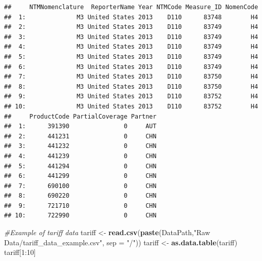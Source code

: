 \documentclass[10pt,]{article}
\newenvironment{Shaded}{\begin{snugshade}}{\end{snugshade}}
\newcommand{\KeywordTok}[1]{\textcolor[rgb]{0.13,0.29,0.53}{\textbf{{#1}}}}
\newcommand{\DataTypeTok}[1]{\textcolor[rgb]{0.13,0.29,0.53}{{#1}}}
\newcommand{\DecValTok}[1]{\textcolor[rgb]{0.00,0.00,0.81}{{#1}}}
\newcommand{\StringTok}[1]{\textcolor[rgb]{0.31,0.60,0.02}{{#1}}}
\newcommand{\CommentTok}[1]{\textcolor[rgb]{0.56,0.35,0.01}{\textit{{#1}}}}
\newcommand{\NormalTok}[1]{{#1}}
\begin{document}
\begin{verbatim}
##     NTMNomenclature  ReporterName Year NTMCode Measure_ID NomenCode
##  1:              M3 United States 2013    D110      83748        H4
##  2:              M3 United States 2013    D110      83749        H4
##  3:              M3 United States 2013    D110      83749        H4
##  4:              M3 United States 2013    D110      83749        H4
##  5:              M3 United States 2013    D110      83749        H4
##  6:              M3 United States 2013    D110      83749        H4
##  7:              M3 United States 2013    D110      83750        H4
##  8:              M3 United States 2013    D110      83750        H4
##  9:              M3 United States 2013    D110      83752        H4
## 10:              M3 United States 2013    D110      83752        H4
##     ProductCode PartialCoverage Partner
##  1:      391390               0     AUT
##  2:      441231               0     CHN
##  3:      441232               0     CHN
##  4:      441239               0     CHN
##  5:      441294               0     CHN
##  6:      441299               0     CHN
##  7:      690100               0     CHN
##  8:      690220               0     CHN
##  9:      721710               0     CHN
## 10:      722990               0     CHN
\end{verbatim}

\begin{Shaded}
\begin{Highlighting}[]
\CommentTok{#Example of tariff data}
\NormalTok{tariff <-}\StringTok{ }\KeywordTok{read.csv}\NormalTok{(}\KeywordTok{paste}\NormalTok{(DataPath,}\StringTok{"Raw Data/tariff_data_example.csv"}\NormalTok{, }\DataTypeTok{sep =} \StringTok{"/"}\NormalTok{))}
\NormalTok{tariff <-}\StringTok{ }\KeywordTok{as.data.table}\NormalTok{(tariff)}
\NormalTok{tariff[}\DecValTok{1}\NormalTok{:}\DecValTok{10}\NormalTok{]}
\end{Highlighting}
\end{Shaded}
\end{document}
